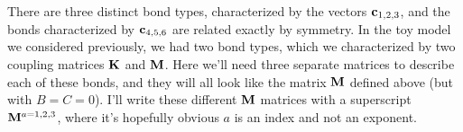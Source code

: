 \documentclass[12pt]{article}
\begin{document}
There are three distinct bond types, characterized by the vectors $\mathbf{c}_{1,2,3}$, and the bonds characterized by $\mathbf{c}_{4,5,6}$ are related exactly by symmetry. In the toy model we considered previously, we had two bond types, which we characterized by two coupling matrices $\mathbf{K}$ and $\mathbf{M}$. Here we'll need three separate matrices to describe each of these bonds, and they will all look like the matrix $\mathbf{M}$ defined above (but with $B=C=0$). I'll write these different $\mathbf{M}$ matrices with a superscript $\mathbf{M}^{a=1,2,3}$, where it's hopefully obvious $a$ is an index and not an exponent.

\end{document}
